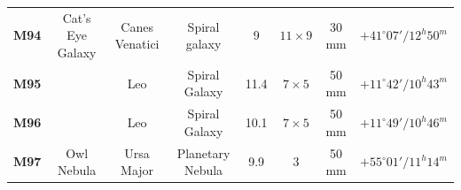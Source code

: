 \documentclass[a4paper,12pt]{extarticle}
\begin{document}
\begin{table}[H]
\begin{tabular}{clcccccc}
\rowcolor[HTML]{00FFFF} 
\textbf{M94}                             & \multicolumn{1}{c}{\cellcolor[HTML]{00FFFF}Cat’s Eye Galaxy}                             & Canes Venatici                                & Spiral galaxy                & 9                                                                                           & $11\times9$                                                                                             & 30 mm                                                                                       & $+41^\circ 07'/ 12^h 50^m$                                                                   \\
\rowcolor[HTML]{00FFFF} 
\textbf{M95}                             &                                                                                          & Leo                                           & Spiral Galaxy               & 11.4                                                                                           & $7\times5$                                                                                              & 50 mm                                                                                       & $+11^\circ 42'/ 10^h 43^m$                                                                   \\
\rowcolor[HTML]{00FFFF} 
\textbf{M96}                             &                                                                                          & Leo                                           & Spiral Galaxy                 & 10.1                                                                                          & $7\times5$                                                                                              & 50 mm                                                                                       & $+11^\circ 49'/ 10^h 46^m$                                                                   \\
\rowcolor[HTML]{D0E0E3} 
\textbf{M97}                             & \multicolumn{1}{c}{\cellcolor[HTML]{D0E0E3}Owl Nebula}                                   & Ursa Major                                    & Planetary Nebula              & 9.9                                                                                            & 3                                                                                               & 50 mm                                                                                       & $+55^\circ  01'/ 11^h 14^m$ \\

\end{tabular}
\end{table}
\end{document}
